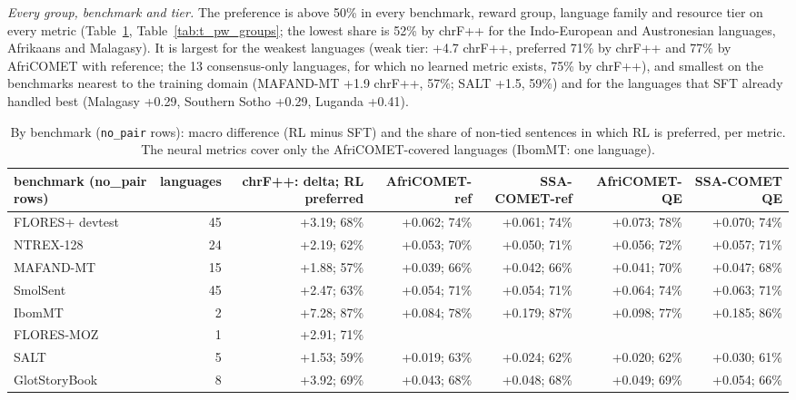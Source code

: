 \emph{Every group, benchmark and tier.} The preference is above 50\% in every benchmark, reward group, language family and resource tier on every metric (Table~\ref{tab:t_pw_bench}, Table~\ref{tab:t_pw_groups}; the lowest share is 52\% by chrF++ for the Indo-European and Austronesian languages, Afrikaans and Malagasy). It is largest for the weakest languages (weak tier: +4.7 chrF++, preferred 71\% by chrF++ and 77\% by AfriCOMET with reference; the 13 consensus-only languages, for which no learned metric exists, 75\% by chrF++), and smallest on the benchmarks nearest to the training domain (MAFAND-MT +1.9 chrF++, 57\%; SALT +1.5, 59\%) and for the languages that SFT already handled best (Malagasy +0.29, Southern Sotho +0.29, Luganda +0.41).

\begin{table}[t]
\centering
\footnotesize
\setlength{\tabcolsep}{3pt}
\caption{By benchmark (\texttt{no\_pair} rows): macro difference (RL minus SFT) and the share of non-tied sentences in which RL is preferred, per metric. The neural metrics cover only the AfriCOMET-covered languages (IbomMT: one language).}
\label{tab:t_pw_bench}
\begin{adjustbox}{max width=\linewidth}
{\def\LTcaptype{none} %
\begin{tabular}{@{}lrrrrrr@{}}
\toprule
benchmark (no\_pair rows) & languages & chrF++: delta; RL preferred & AfriCOMET-ref & SSA-COMET-ref & AfriCOMET-QE & SSA-COMET QE \\
\midrule
FLORES+ devtest & 45 & +3.19; 68\% & +0.062; 74\% & +0.061; 74\% & +0.073; 78\% & +0.070; 74\% \\
NTREX-128 & 24 & +2.19; 62\% & +0.053; 70\% & +0.050; 71\% & +0.056; 72\% & +0.057; 71\% \\
MAFAND-MT & 15 & +1.88; 57\% & +0.039; 66\% & +0.042; 66\% & +0.041; 70\% & +0.047; 68\% \\
SmolSent & 45 & +2.47; 63\% & +0.054; 71\% & +0.054; 71\% & +0.064; 74\% & +0.063; 71\% \\
IbomMT & 2 & +7.28; 87\% & +0.084; 78\% & +0.179; 87\% & +0.098; 77\% & +0.185; 86\% \\
FLORES-MOZ & 1 & +2.91; 71\% & & & & \\
SALT & 5 & +1.53; 59\% & +0.019; 63\% & +0.024; 62\% & +0.020; 62\% & +0.030; 61\% \\
GlotStoryBook & 8 & +3.92; 69\% & +0.043; 68\% & +0.048; 68\% & +0.049; 69\% & +0.054; 66\% \\
\bottomrule
\end{tabular}
}
\end{adjustbox}
\end{table}

